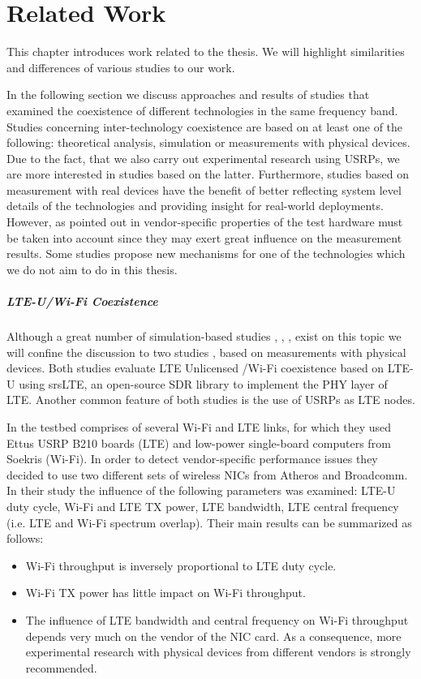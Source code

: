 \chapter{Related Work}
\label{ch:related-work}

This chapter introduces work related to the thesis. We will highlight similarities and differences of various studies to our work. 

In the following section we discuss approaches and results of studies that examined the coexistence of different technologies in the same frequency band. Studies concerning inter-technology coexistence are based on at least one of the following: theoretical analysis, simulation or measurements with physical devices. Due to the fact, that we also carry out experimental research using USRPs, we are more interested in studies based on the latter. Furthermore, studies based on measurement with real devices have the benefit of better reflecting system level details of the technologies and providing insight for real-world deployments. However, as pointed out in \cite{gomezmiguelez16} vendor-specific properties of the test hardware must be taken into account since they may exert great influence on the measurement results. Some studies propose new mechanisms for one of the technologies which we do not aim to do in this thesis.

\paragraph{LTE-U/Wi-Fi Coexistence}
Although a great number of simulation-based studies \cite{nihtilä13}, \cite{rupasinghe14}, \cite{jeon14}, \cite{cavalcante13} exist on this topic we will confine the discussion to two studies \cite{gomezmiguelez16}, \cite{capretti16} based on measurements with physical devices. Both studies evaluate LTE Unlicensed /Wi-Fi coexistence based on LTE-U using srsLTE, an open-source SDR library to implement the PHY layer of LTE. Another common feature of both studies is the use of USRPs as LTE nodes. 

In \cite{gomezmiguelez16} the testbed comprises of several Wi-Fi and LTE links, for which they used Ettus USRP B210 boards (LTE) and low-power single-board computers from Soekris (Wi-Fi). In order to detect vendor-specific performance issues they decided to use two different sets of wireless NICs from Atheros and Broadcomm. In their study the influence of the following parameters was examined: LTE-U duty cycle, Wi-Fi and LTE TX power, LTE bandwidth, LTE central frequency (i.e. LTE and Wi-Fi spectrum overlap). Their main results can be summarized as follows:
\begin{itemize}
	\item  Wi-Fi throughput is inversely proportional to LTE duty cycle.
	\item  Wi-Fi TX power has little impact on Wi-Fi throughput.
	\item  The influence of LTE bandwidth and central frequency on Wi-Fi throughput depends very much on the vendor of the NIC card. As a consequence, more experimental research with physical devices from different vendors is strongly recommended. 
\end{itemize}
  
